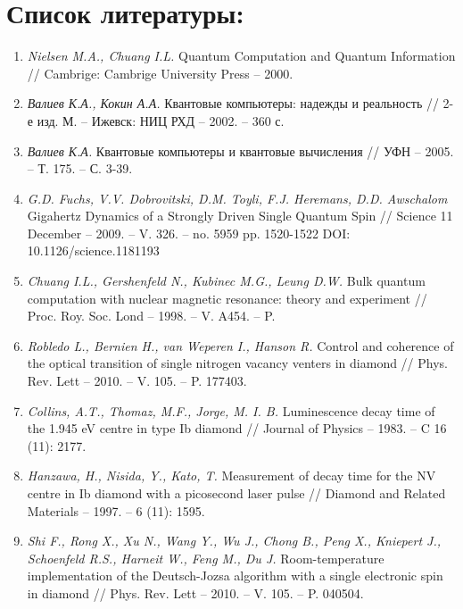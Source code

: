 \newpage
\chapter*{Список литературы:}
\begin{enumerate}
\item \textit{Nielsen M.A., Chuang I.L.} Quantum Computation and Quantum
Information // Cambrige: Cambrige University Press -- 2000.\label{lit:nil-chang}
\item \textit{Валиев К.А., Кокин А.А.} Квантовые компьютеры: надежды и
  реальность // 2-е изд. М. -- Ижевск: НИЦ РХД -- 2002. -- 360
  с. \label{lit:valiev-kokin}
\item \textit{Валиев К.А.} Квантовые компьютеры и квантовые вычисления //
  УФН -- 2005. -- Т. 175. -- С. 3-39.\label{lit:valiev}
\item \textit{G.D. Fuchs, V.V. Dobrovitski, D.M. Toyli, F.J. Heremans,
  D.D. Awschalom} Gigahertz Dynamics of a Strongly Driven Single
  Quantum Spin // Science 11 December -- 2009. -- V. 326. -- no. 5959
  pp. 1520-1522 DOI: 10.1126/science.1181193\label{lit:gigahertz}
\item \textit{Chuang I.L., Gershenfeld N., Kubinec M.G., Leung D.W.} Bulk
  quantum computation with nuclear magnetic resonance: theory and
  experiment //
  Proc. Roy. Soc. Lond -- 1998. -- V. A454. -- P.\label{lit:first-demonstration}
\item \textit{Robledo L., Bernien H., van Weperen I., Hanson R.} Control and
  coherence of the optical transition of single nitrogen vacancy
  venters in diamond //
  Phys. Rev. Lett -- 2010. -- V. 105. -- P. 177403.\label{lit:excitef-oscilations}
\item \textit{Collins, A.T., Thomaz, M.F., Jorge, M. I. B.}
  Luminescence decay time of the 1.945 eV centre in type Ib diamond //
  Journal of Physics -- 1983. -- C 16 (11): 2177.\label{lit:lumin-collins}
\item \textit{Hanzawa, H., Nisida, Y., Kato, T.} Measurement of decay
  time for the NV centre in Ib diamond with a picosecond laser pulse
  // Diamond and Related Materials -- 1997. -- 6 (11): 1595.\label{lit:lumin-Hanzawa}
\item \textit{Shi F., Rong X., Xu N., Wang Y., Wu J., Chong B., Peng X.,
  Kniepert J., Schoenfeld R.S., Harneit W., Feng M., Du
  J.} Room-temperature implementation of the Deutsch-Jozsa algorithm
  with a single electronic spin in diamond //
  Phys. Rev. Lett -- 2010. -- V. 105. -- P. 040504.\label{lit:nv-deutsch}

\end{enumerate}
